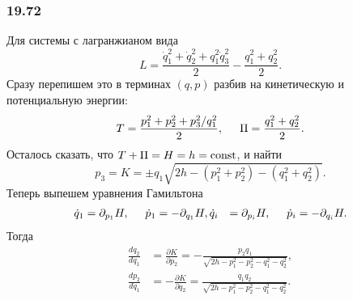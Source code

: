 \subsubsection*{19.72}

Для системы с лагранжианом вида
\begin{equation*}
    L = \frac{\dot{q}^2_1 + \dot{q}^2_2 + {q}^2_1 \dot{q}^2_3}{2} - \frac{q_1^2+q_2^2}{2}.
\end{equation*}
Сразу перепишем это в терминах $(q, p)$ разбив на кинетическую и потенциальную энергии:
\begin{equation*}
    T = \frac{p_1^2 + p_2^2 + p_3^2/q_1^2}{2},
    \hspace{5 mm} 
    \Pi = \frac{q_1^2+q_2^2}{2}.
\end{equation*}
Осталось сказать, что $T + \Pi = H = h = \text{const}$, и найти
\begin{equation*}
    p_3 = K = \pm q_1 \sqrt{2 h - (p_1^2+p_2^2)-(q_1^2+q_2^2)}.
\end{equation*}
Теперь выпешем уравнения Гамильтона
\begin{align*}
    \dot{q}_1 &= \partial_{p_1} H, \hspace{5 mm} \dot{p}_1 = - \partial_{q_1} H,
    \dot{q}_i &= \partial_{p_i} H, \hspace{5 mm} \dot{p}_i = - \partial_{q_i} H.
\end{align*}
Тогда
\begin{align*}
    \frac{d q_2}{d q_1} &= \frac{\partial K}{\partial p_2} = -\frac{p_2 q_1}{\sqrt{2 h-p_1^2-p_2^2-q_1^2-q_2^2}},
    \\
    \frac{d p_2}{d q_1} &= - \frac{\partial K}{\partial q_2} = \frac{q_1 q_2}{\sqrt{2 h-p_1^2-p_2^2-q_1^2-q_2^2}}.
\end{align*}

